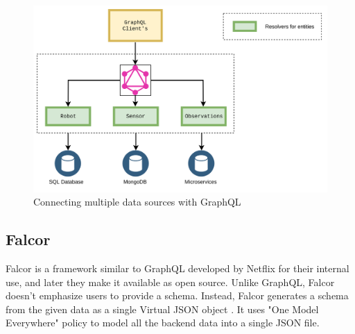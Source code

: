 	\begin{figure}[!htbp] 
		\begin{center}
			\includegraphics[trim={0 0 0 2cm},clip,scale=0.07]{./images/png/multiple_db_support}	
			\caption{ Connecting multiple data sources with GraphQL}	
			\label{fig:multiple_db_support}	
		\end{center}
	\end{figure}

	\subsection{Falcor}
	Falcor is a framework similar to GraphQL developed by Netflix for their internal use, and later they make it available as open source. Unlike GraphQL, Falcor doesn't emphasize users to provide a schema. Instead, Falcor generates a schema from the given data as a single Virtual JSON object \cite{misc03}. It uses "One Model Everywhere" \cite{misc03} policy to model all the backend data into a single JSON file.
	
